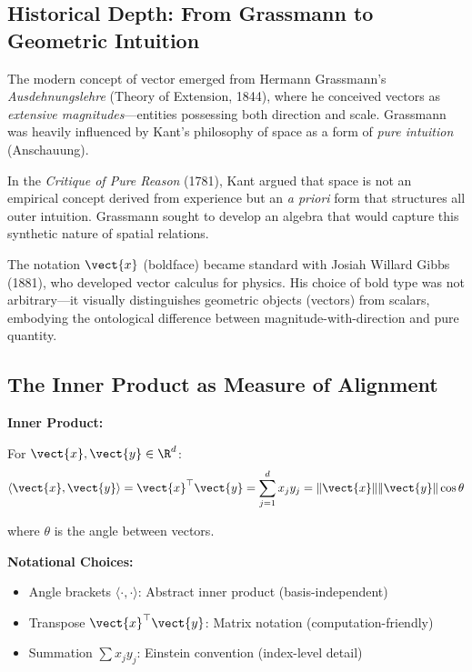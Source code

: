 \subsection{Historical Depth: From Grassmann to Geometric Intuition}

The modern concept of vector emerged from Hermann Grassmann's \textit{Ausdehnungslehre} (Theory of Extension, 1844), where he conceived vectors as \textit{extensive magnitudes}---entities possessing both direction and scale. Grassmann was heavily influenced by Kant's philosophy of space as a form of \textit{pure intuition} (Anschauung).

\begin{remark}
	In the \textit{Critique of Pure Reason} (1781), Kant argued that space is not an empirical concept derived from experience but an \textit{a priori} form that structures all outer intuition. Grassmann sought to develop an algebra that would capture this synthetic nature of spatial relations.
\end{remark}

The notation $\vect{x}$ (boldface) became standard with Josiah Willard Gibbs (1881), who developed vector calculus for physics. His choice of bold type was not arbitrary---it visually distinguishes geometric objects (vectors) from scalars, embodying the ontological difference between magnitude-with-direction and pure quantity.

\subsection{The Inner Product as Measure of Alignment}

\begin{seanbox}{1.2}
	\textbf{Inner Product:}
	
	For $\vect{x}, \vect{y} \in \R^d$:
	\begin{equation}
		\langle \vect{x}, \vect{y} \rangle = \vect{x}^\top \vect{y} = \sum_{j=1}^d x_j y_j = \|\vect{x}\| \|\vect{y}\| \cos\theta
	\end{equation}
	
	where $\theta$ is the angle between vectors.
	
	\textbf{Notational Choices:}
	\begin{itemize}
		\item Angle brackets $\langle \cdot, \cdot \rangle$: Abstract inner product (basis-independent)
		\item Transpose $\vect{x}^\top \vect{y}$: Matrix notation (computation-friendly)
		\item Summation $\sum x_j y_j$: Einstein convention (index-level detail)
	\end{itemize}
\end{seanbox}

